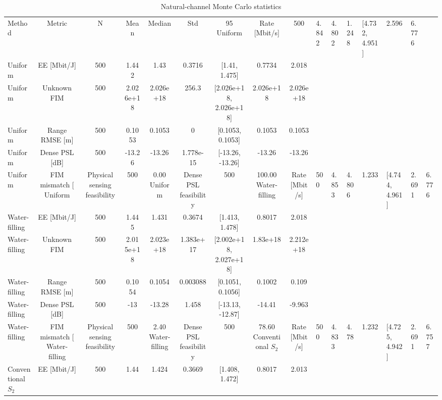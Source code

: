 \begin{table}[t]
\centering
\caption{Natural-channel Monte Carlo statistics}
\label{tab:mc}
\begin{tabular}{lcccccccc}
\hline
Method & Metric & N & Mean & Median & Std & 95%
\hline
Uniform & Rate [Mbit/s] & 500 & 4.842 & 4.802 & 1.248 & [4.732, 4.951] & 2.596 & 6.776 \\
Uniform & EE [Mbit/J] & 500 & 1.442 & 1.43 & 0.3716 & [1.41, 1.475] & 0.7734 & 2.018 \\
Uniform & Unknown FIM & 500 & 2.026e+18 & 2.026e+18 & 256.3 & [2.026e+18, 2.026e+18] & 2.026e+18 & 2.026e+18 \\
Uniform & Range RMSE [m] & 500 & 0.1053 & 0.1053 & 0 & [0.1053, 0.1053] & 0.1053 & 0.1053 \\
Uniform & Dense PSL [dB] & 500 & -13.26 & -13.26 & 1.778e-15 & [-13.26, -13.26] & -13.26 & -13.26 \\
Uniform & FIM mismatch [%
Uniform & Physical sensing feasibility & 500 & 0.00%
Uniform & Dense PSL feasibility & 500 & 100.00%
Water-filling & Rate [Mbit/s] & 500 & 4.853 & 4.806 & 1.233 & [4.744, 4.961] & 2.691 & 6.776 \\
Water-filling & EE [Mbit/J] & 500 & 1.445 & 1.431 & 0.3674 & [1.413, 1.478] & 0.8017 & 2.018 \\
Water-filling & Unknown FIM & 500 & 2.015e+18 & 2.023e+18 & 1.383e+17 & [2.002e+18, 2.027e+18] & 1.83e+18 & 2.212e+18 \\
Water-filling & Range RMSE [m] & 500 & 0.1054 & 0.1054 & 0.003088 & [0.1051, 0.1056] & 0.1002 & 0.109 \\
Water-filling & Dense PSL [dB] & 500 & -13 & -13.28 & 1.458 & [-13.13, -12.87] & -14.41 & -9.963 \\
Water-filling & FIM mismatch [%
Water-filling & Physical sensing feasibility & 500 & 2.40%
Water-filling & Dense PSL feasibility & 500 & 78.60%
Conventional $S_2$ & Rate [Mbit/s] & 500 & 4.833 & 4.78 & 1.232 & [4.725, 4.942] & 2.691 & 6.757 \\
Conventional $S_2$ & EE [Mbit/J] & 500 & 1.44 & 1.424 & 0.3669 & [1.408, 1.472] & 0.8017 & 2.013 \\

\end{tabular}
\end{table}
